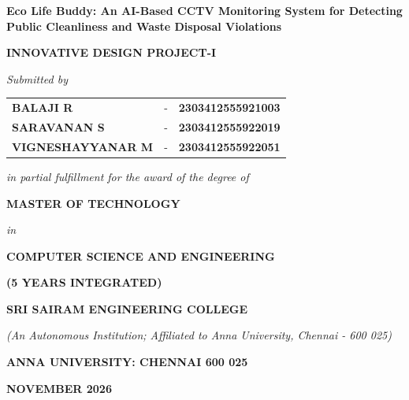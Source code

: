 \documentclass[12pt,a4paper]{report}
\begin{document}
\begin{titlepage}
\centering
\vspace*{0.5cm}

{\Large \textbf{Eco Life Buddy: An AI-Based CCTV Monitoring System for Detecting Public Cleanliness and Waste Disposal Violations}\par}
\vspace{0.8cm}

{\large \textbf{INNOVATIVE DESIGN PROJECT-I}\par}
\vspace{0.8cm}

\textit{Submitted by}\par
\vspace{0.4cm}
\begin{tabular}{lcl}
\textbf{BALAJI R} & - & \textbf{2303412555921003} \\
\textbf{SARAVANAN S} & - & \textbf{2303412555922019} \\
\textbf{VIGNESHAYYANAR M} & - & \textbf{2303412555922051} \\
\end{tabular}
\par
\vspace{1.0cm}

\textit{in partial fulfillment for the award of the degree of}\par
\vspace{0.3cm}
{\large \textbf{MASTER OF TECHNOLOGY}\par}
\textit{in}\par
{\large \textbf{COMPUTER SCIENCE AND ENGINEERING}\par}
\textbf{(5 YEARS INTEGRATED)}\par
\vspace{1.2cm}

\textbf{SRI SAIRAM ENGINEERING COLLEGE}\par
\textit{(An Autonomous Institution; Affiliated to Anna University, Chennai - 600 025)}\par
\vspace{0.5cm}

\textbf{ANNA UNIVERSITY: CHENNAI 600 025}\par
\vspace{0.8cm}
\textbf{NOVEMBER 2026}\par

\end{titlepage}
\end{document}
